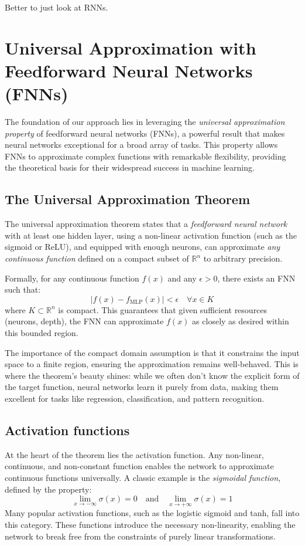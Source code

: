 \documentclass{article}
\theoremstyle{definition}
\theoremstyle{remark}
\begin{document}
Better to just look at RNNs. 



\newpage




\newpage
\appendix 

\section{Universal Approximation with Feedforward Neural Networks (FNNs)}

The foundation of our approach lies in leveraging the \textit{universal approximation property} of feedforward neural networks (FNNs), a powerful result that makes neural networks exceptional for a broad array of tasks. This property allows FNNs to approximate complex functions with remarkable flexibility, providing the theoretical basis for their widespread success in machine learning.

\subsection{The Universal Approximation Theorem}

The universal approximation theorem states that a \textit{feedforward neural network} with at least one hidden layer, using a non-linear activation function (such as the sigmoid or ReLU), and equipped with enough neurons, can approximate \textit{any continuous function} defined on a compact subset of \(\mathbb{R}^n\) to arbitrary precision.

Formally, for any continuous function \(f(x)\) and any \(\epsilon > 0\), there exists an FNN such that:
\[
| f(x) - f_{\text{MLP}}(x) | < \epsilon \quad \forall x \in K
\]
where \(K \subset \mathbb{R}^n\) is compact. This guarantees that given sufficient resources (neurons, depth), the FNN can approximate \(f(x)\) as closely as desired within this bounded region.

The importance of the compact domain assumption is that it constrains the input space to a finite region, ensuring the approximation remains well-behaved.
This is where the theorem’s beauty shines: while we often don’t know the explicit form of the target function, neural networks learn it purely from data, making them excellent for tasks like regression, classification, and pattern recognition.



\subsection{Activation functions} %
At the heart of the theorem lies the activation function. Any non-linear, continuous, and non-constant function enables the network to approximate continuous functions universally.
A classic example is the \textit{sigmoidal function}, defined by the property:
\[
\lim_{x \to -\infty} \sigma(x) = 0 \quad \text{and} \quad \lim_{x \to +\infty} \sigma(x) = 1
\]
Many popular activation functions, such as the logistic sigmoid and tanh, fall into this category.
These functions introduce the necessary non-linearity, enabling the network to break free from the constraints of purely linear transformations.
\end{document}
